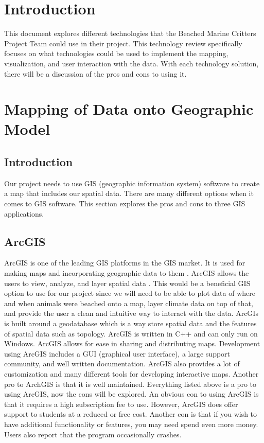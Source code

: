 \documentclass[onecolumn, draftclsnofoot,10pt, compsoc]{IEEEtran}
\def \CapstoneTeamName{		Beached Marine Critters Project Team}
\begin{document}
\begin{singlespace}
\section{Introduction}
This document explores different technologies that the\CapstoneTeamName{} could use in their project. This technology review specifically focuses on what technologies could be used to implement the mapping, visualization, and user interaction with the data. With each technology solution, there will be a discussion of the pros and cons to using it.

\section{Mapping of Data onto Geographic Model}

\subsection{Introduction}
Our project needs to use GIS (geographic information system) software to create a map that includes our spatial data. There are many different options when it comes to GIS software. This section explores the pros and cons to three GIS applications. 

\subsection{ArcGIS}
ArcGIS is one of the leading GIS platforms in the GIS market. It is used for making maps and incorporating geographic data to them \cite{ARCGIS-WIKIPEDIA}. ArcGIS allows the users to view, analyze, and layer spatial data \cite{ARCGIS-WIKIPEDIA}. This would be a beneficial GIS option to use for our project since we will need to be able to plot data of where and when animals were beached onto a map, layer climate data on top of that, and provide the user a clean and intuitive way to interact with the data. ArcGIs is built around a geodatabase which is a way store spatial data and the features of spatial data such as topology. ArcGIS is written in C++ and can only run on Windows. ArcGIS allows for ease in sharing and distributing maps. Development using ArcGIS includes a GUI (graphical user interface), a large support community, and well written documentation. ArcGIS also provides a lot of customization and many different tools for developing interactive maps. Another pro to ArchGIS is that it is well maintained. Everything listed above is a pro to using ArcGIS, now the cons will be explored. An obvious con to using ArcGIS is that it requires a high subscription fee to use. However, ArcGIS does offer support to students at a reduced or free cost. Another con is that if you wish to have additional functionality or features, you may need spend even more money. Users also report that the program occasionally crashes.


\end{singlespace}
\end{document}
